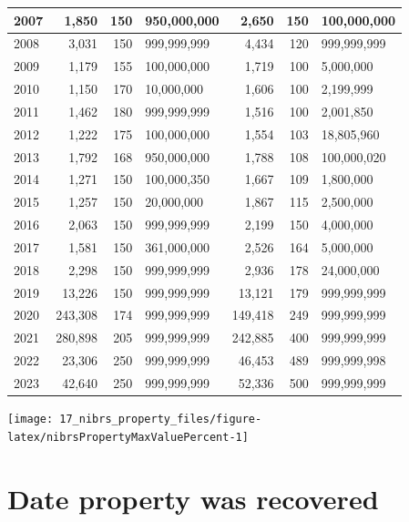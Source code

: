\documentclass[
]{krantz}
\let\origfigure\figure
\let\endorigfigure\endfigure
\renewenvironment{figure}[1][2] {
    \expandafter\origfigure\expandafter[H]
} {
    \endorigfigure
}
\begin{document}
\begin{longtable}[t]{l|r|r|l|r|r|l}
\hline
2007 & 1,850 & 150 & 950,000,000 & 2,650 & 150 & 100,000,000\\
\hline
2008 & 3,031 & 150 & 999,999,999 & 4,434 & 120 & 999,999,999\\
\hline
2009 & 1,179 & 155 & 100,000,000 & 1,719 & 100 & 5,000,000\\
\hline
2010 & 1,150 & 170 & 10,000,000 & 1,606 & 100 & 2,199,999\\
\hline
2011 & 1,462 & 180 & 999,999,999 & 1,516 & 100 & 2,001,850\\
\hline
2012 & 1,222 & 175 & 100,000,000 & 1,554 & 103 & 18,805,960\\
\hline
2013 & 1,792 & 168 & 950,000,000 & 1,788 & 108 & 100,000,020\\
\hline
2014 & 1,271 & 150 & 100,000,350 & 1,667 & 109 & 1,800,000\\
\hline
2015 & 1,257 & 150 & 20,000,000 & 1,867 & 115 & 2,500,000\\
\hline
2016 & 2,063 & 150 & 999,999,999 & 2,199 & 150 & 4,000,000\\
\hline
2017 & 1,581 & 150 & 361,000,000 & 2,526 & 164 & 5,000,000\\
\hline
2018 & 2,298 & 150 & 999,999,999 & 2,936 & 178 & 24,000,000\\
\hline
2019 & 13,226 & 150 & 999,999,999 & 13,121 & 179 & 999,999,999\\
\hline
2020 & 243,308 & 174 & 999,999,999 & 149,418 & 249 & 999,999,999\\
\hline
2021 & 280,898 & 205 & 999,999,999 & 242,885 & 400 & 999,999,999\\
\hline
2022 & 23,306 & 250 & 999,999,999 & 46,453 & 489 & 999,999,998\\
\hline
2023 & 42,640 & 250 & 999,999,999 & 52,336 & 500 & 999,999,999\\
\hline
\end{longtable}

\begin{figure}

{\centering \texttt{[image: 17\_nibrs\_property\_files/figure-latex/nibrsPropertyMaxValuePercent-1]} 

}

\caption{Annual percent of the value of all property stolen that is made up of the value that is the maximum dollar amount reported in that year, 1991-2023.}\label{fig:nibrsPropertyMaxValuePercent}
\end{figure}

\section{Date property was
recovered}\label{date-property-was-recovered}
\end{document}
